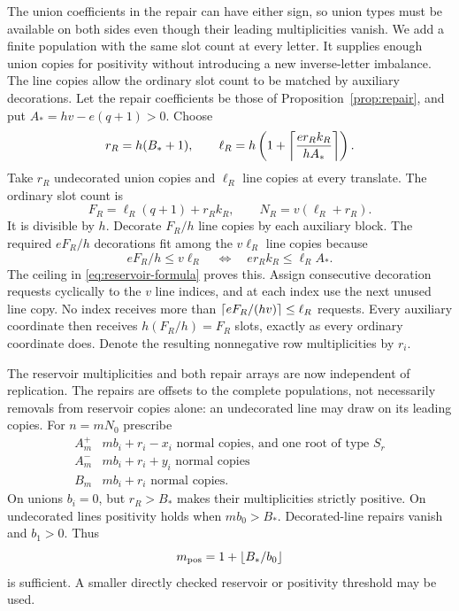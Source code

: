 The union coefficients in the repair can have either sign, so union types must be available on both sides even though their leading multiplicities vanish. We add a finite population with the same slot count at every letter. It supplies enough union copies for positivity without introducing a new inverse-letter imbalance. The line copies allow the ordinary slot count to be matched by auxiliary decorations.
Let the repair coefficients be those of Proposition~\ref{prop:repair}, and put $A_*=hv-e(q+1)>0$. Choose
\begin{equation}\label{eq:reservoir-formula}
 r_R=h(B_*+1),\qquad
 \ell_R=h\left(1+\left\lceil \frac{e r_R k_R}{hA_*}\right\rceil\right).
\end{equation}
Take $r_R$ undecorated union copies and $\ell_R$ line copies at every translate. The ordinary slot count is
\begin{equation}\label{eq:reservoir-slots}
 F_R=\ell_R(q+1)+r_Rk_R,
 \qquad N_R=v(\ell_R+r_R).
\end{equation}
It is divisible by $h$. Decorate $F_R/h$ line copies by each auxiliary block. The required $eF_R/h$ decorations fit among the $v\ell_R$ line copies because
\[
 eF_R/h\le v\ell_R
 \quad\Longleftrightarrow\quad
 e r_R k_R\le\ell_R A_*.
\]
The ceiling in \eqref{eq:reservoir-formula} proves this. Assign consecutive decoration requests cyclically to the $v$ line indices, and at each index use the next unused line copy. No index receives more than $\left\lceil eF_R/(hv)\right\rceil\le\ell_R$ requests. Every auxiliary coordinate then receives $h(F_R/h)=F_R$ slots, exactly as every ordinary coordinate does. Denote the resulting nonnegative row multiplicities by $r_i$.

The reservoir multiplicities and both repair arrays are now independent of replication. The repairs are offsets to the complete populations, not necessarily removals from reservoir copies alone: an undecorated line may draw on its leading copies. For $n=mN_0$ prescribe
\begin{equation}\label{eq:affine-classes}
\begin{array}{c|l}
 A_m^+& mb_i+r_i-x_i\text{ normal copies, and one root of type }S_r\\
 A_m^-& mb_i+r_i+y_i\text{ normal copies}\\
 B_m& mb_i+r_i\text{ normal copies}.
\end{array}
\end{equation}
On unions $b_i=0$, but $r_R>B_*$ makes their multiplicities strictly positive. On undecorated lines positivity holds when $mb_0>B_*$. Decorated-line repairs vanish and $b_1>0$. Thus
\begin{equation}\label{eq:mpos}
 m_{\rm pos}=1+\left\lfloor B_*/b_0\right\rfloor
\end{equation}
is sufficient. A smaller directly checked reservoir or positivity threshold may be used.

